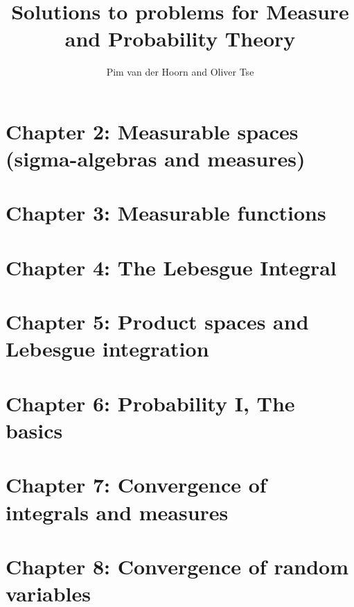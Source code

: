 \documentclass{lecturenotes}
\begin{document}
\begin{titlepage}
    \title{Solutions to problems for Measure and Probability Theory}
    \author{Pim van der Hoorn and Oliver Tse}
    \maketitle
\end{titlepage}


\section*{Chapter 2: Measurable spaces (sigma-algebras and measures)}



\section*{Chapter 3: Measurable functions}



\section*{Chapter 4: The Lebesgue Integral}


\section*{Chapter 5: Product spaces and Lebesgue integration}



\section*{Chapter 6: Probability I, The basics}




\section*{Chapter 7: Convergence of integrals and measures}



\section*{Chapter 8: Convergence of random variables}


\end{document}
